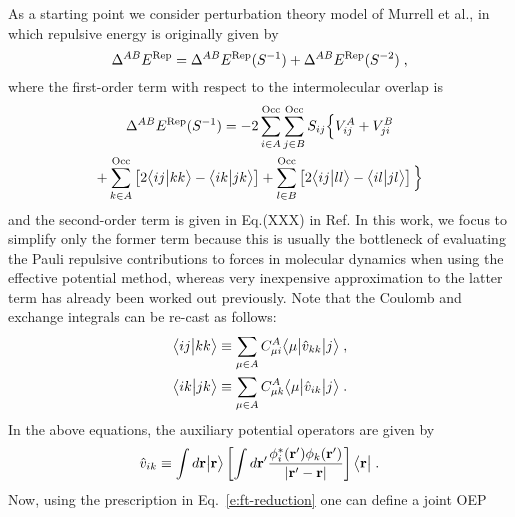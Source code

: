 As a starting point we consider perturbation theory model of Murrell et al.,
in which repulsive energy is originally given by
%
\begin{equation}
 \Delta^{AB} E^{\rm Rep} = 
 \Delta^{AB} E^{\rm Rep}(S^{-1}) + 
 \Delta^{AB} E^{\rm Rep}(S^{-2}) \;,
\end{equation}
%
where the first\hyp{}order term with respect to the intermolecular overlap is
%
\begin{multline} \label{e:rep.murrell-etal.S1}
  \Delta^{AB}  E^{\rm Rep}(S^{-1}) = -2\sum_{i\in A}^{\rm Occ} \sum_{j\in B}^{\rm Occ}
               S_{ij} \Big\{
           V^A_{ij} 
         + V^B_{ji} \\
 + \sum_{k\in A}^{\rm Occ} \left[ 2\BraKet{ij}{kk} - \BraKet{ik}{jk} \right] 
 + \sum_{l\in B}^{\rm Occ} \left[ 2\BraKet{ij}{ll} - \BraKet{il}{jl} \right]
                \Big\}
\end{multline}
%
and the second\hyp{}order term is given in Eq.(XXX) in Ref. %
In this work, we focus to simplify only the former term because this is usually
the bottleneck of evaluating the Pauli repulsive contributions to
forces in molecular dynamics when using the effective potential method, whereas
very inexpensive approximation to the latter term has already been worked out previously. %
Note that the Coulomb and exchange integrals can be re\hyp{}cast as follows:
%
\begin{subequations}
 \begin{align}
 \BraKet{ij}{kk} &\equiv \sum_{\mu\in A} 
     C_{\mu i}^A \tBraKet{\mu}{\hat{v}_{kk}}{j} \;, \\
 \BraKet{ik}{jk} &\equiv \sum_{\mu\in A} 
     C_{\mu k}^A \tBraKet{\mu}{\hat{v}_{ik}}{j} \;.
 \end{align}
\end{subequations}
%
%
%
In the above equations, the auxiliary potential operators are given by
%
\begin{equation}
  \hat{v}_{ik} \equiv \int d{\bf r} \Ket{{\bf r}} 
        \left[
        \int d{\bf r}' \frac{\phi_i^{*}({\bf r}') \phi_k({\bf r}')}{\vert {\bf r}' - {\bf r}\vert}
        \right] \Bra{{\bf r}} \;.
\end{equation}
%
Now, using the prescription in Eq.~\eqref{e:ft-reduction} one can define a joint OEP
